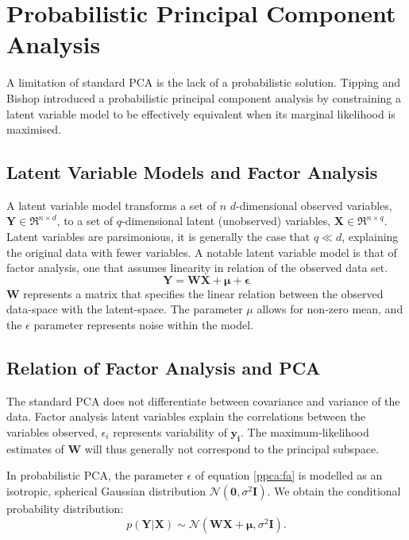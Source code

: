 \documentclass[ %
                    author={Dillon Keith Diep},
                supervisor={Dr. Carl Henrik Ek},
                    degree={MEng},
                     title={Assisted Content Generation for 3D Hair Geometry},
                  subtitle={[INCOMPLETE DRAFT, NOT FOR SUBMISSION]},
                      type={Research},
                      year={2014} ]{dissertation}
\begin{document}
\section{Probabilistic Principal Component Analysis}
A limitation of standard PCA is the lack of a probabilistic solution. Tipping and Bishop introduced a probabilistic principal component analysis by constraining a latent variable model to be effectively equivalent when its marginal likelihood is maximised. \cite{ppca}

\subsection{Latent Variable Models and Factor Analysis}
A latent variable model transforms a set of $n$ $d$-dimensional observed variables, $\mathbf{Y}\in\Re^{n \times d}$, to a set of $q$-dimensional latent (unobserved) variables, $\mathbf{X}\in\Re^{n \times q}$. Latent variables are parsimonious, it is generally the case that $q \ll d$, explaining the original data with fewer variables. A notable latent variable model is that of factor analysis, one that assumes linearity in relation of the observed data set.
\begin{equation} \label{ppca:fa}
	\mathbf{Y=WX+\mu+\epsilon}
\end{equation}
$\mathbf{W}$ represents a matrix that specifies the linear relation between the observed data-space with the latent-space.
The parameter $\mu$ allows for non-zero mean, and the $\epsilon$ parameter represents noise within the model.

\subsection{Relation of Factor Analysis and PCA}
The standard PCA does not differentiate between covariance and variance of the data. Factor analysis latent variables explain the correlations between the variables observed, $\epsilon_i$ represents variability of $\mathbf{y_i}$. The maximum-likelihood estimates of $\mathbf{W}$ will thus generally not correspond to the principal subspace.

In probabilistic PCA, the parameter $\epsilon$ of equation \ref{ppca:fa} is modelled as an isotropic, spherical Gaussian distribution $\mathcal{N}(\mathbf{0},\sigma^2\mathbf{I})$. We obtain the conditional probability distribution:
\begin{equation} \label{ppca:conditional}
	p(\mathbf{Y|X})\sim\mathcal{N}(\mathbf{WX+\mu},\sigma^2\mathbf{I}). 
\end{equation}
\end{document}
